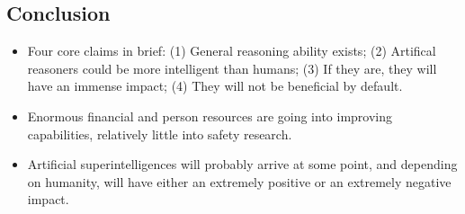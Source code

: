 \documentclass{article}
\begin{document}
\begin{multicols}{2}
\section{Conclusion}
\begin{itemize}
\item Four core claims in brief: (1) General reasoning ability exists; (2) Artifical reasoners could be more intelligent than humans; (3) If they are, they will have an immense impact; (4) They will not be beneficial by default.
\item Enormous financial and person resources are going into improving capabilities, relatively little into safety research.
\item Artificial superintelligences will probably arrive at some point, and depending on humanity, will have either an extremely positive or an extremely negative impact.
\end{itemize}

\end{multicols}
\end{document}
